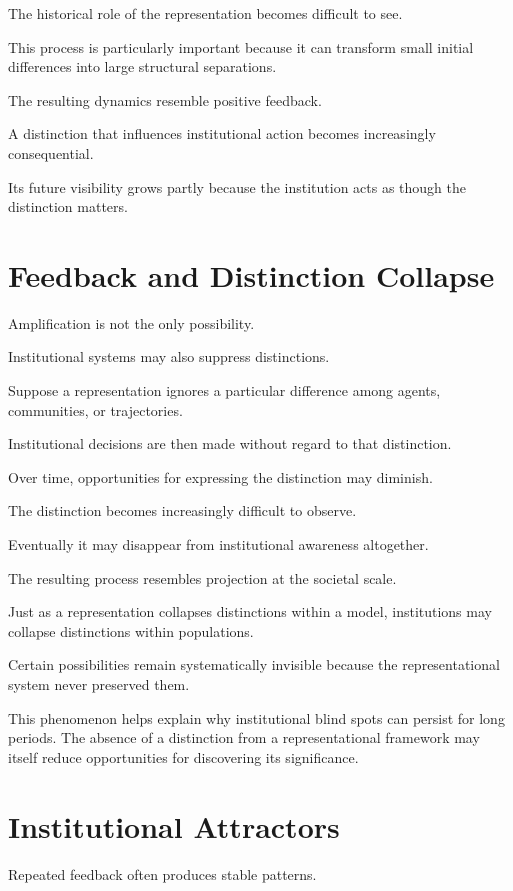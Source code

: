 \documentclass[11pt,oneside,openany]{book}
\begin{document}
The historical role of the representation becomes difficult to see.

This process is particularly important because it can transform small initial differences into large structural separations.

The resulting dynamics resemble positive feedback.

A distinction that influences institutional action becomes increasingly consequential.

Its future visibility grows partly because the institution acts as though the distinction matters.

\section{Feedback and Distinction Collapse}

Amplification is not the only possibility.

Institutional systems may also suppress distinctions.

Suppose a representation ignores a particular difference among agents, communities, or trajectories.

Institutional decisions are then made without regard to that distinction.

Over time, opportunities for expressing the distinction may diminish.

The distinction becomes increasingly difficult to observe.

Eventually it may disappear from institutional awareness altogether.

The resulting process resembles projection at the societal scale.

Just as a representation collapses distinctions within a model, institutions may collapse distinctions within populations.

Certain possibilities remain systematically invisible because the representational system never preserved them.

This phenomenon helps explain why institutional blind spots can persist for long periods. The absence of a distinction from a representational framework may itself reduce opportunities for discovering its significance.

\section{Institutional Attractors}

Repeated feedback often produces stable patterns.
\end{document}
